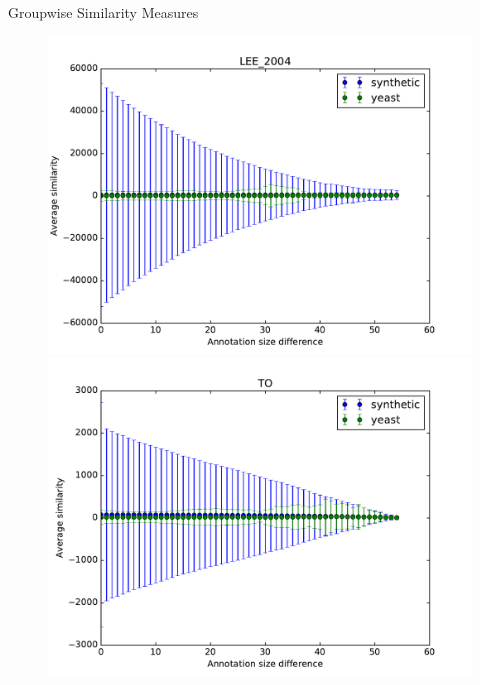 \documentclass{beamer}
\begin{document}
\begin{frame}{Groupwise Similarity Measures}
\begin{figure}
\includegraphics[width=0.5\linewidth, height=0.4\textheight]{groupwise_diff/SIM_GROUPWISE_DAG_LEE_2004_diff.pdf}
\includegraphics[width=0.5\linewidth, height=0.4\textheight]{groupwise_diff/SIM_GROUPWISE_DAG_TO_diff.pdf} \end{figure}
\end{frame}
\end{document}
